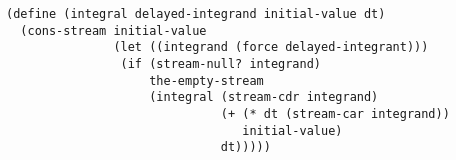\documentclass[a4paper,12pt]{article}
\begin{document}
\begin{lstlisting}
(define (integral delayed-integrand initial-value dt)
  (cons-stream initial-value
               (let ((integrand (force delayed-integrant)))
                (if (stream-null? integrand)
                    the-empty-stream
                    (integral (stream-cdr integrand)
                              (+ (* dt (stream-car integrand))
                                 initial-value)
                              dt)))))
\end{lstlisting}
\end{document}
